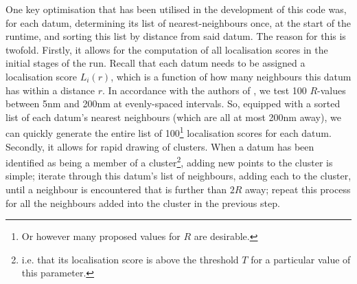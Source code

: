 \documentclass[11pt]{article}
\begin{document}
One key optimisation that has been utilised in the development of this code was, for each datum, determining its list of nearest-neighbours once, at the start of the runtime, and sorting this list by distance from said datum. The reason for this is twofold. Firstly, it allows for the computation of all localisation scores in the initial stages of the run. Recall that each datum needs to be assigned a localisation score $L_i(r)$, which is a function of how many neighbours this datum has within a distance $r$. In accordance with the authors of \cite{Rubin-Delanchy2015}, we test 100 $R$-values between 5nm and 200nm at evenly-spaced intervals. So, equipped with a sorted list of each datum's nearest neighbours (which are all at most 200nm away), we can quickly generate the entire list of 100\footnote{Or however many proposed values for $R$ are desirable.} localisation scores for each datum. \\

Secondly, it allows for rapid drawing of clusters. When a datum has been identified as being a member of a cluster\footnote{i.e. that its localisation score is above the threshold $T$ for a particular value of this parameter.}, adding new points to the cluster is simple; iterate through this datum's list of neighbours, adding each to the cluster, until a neighbour is encountered that is further than $2R$ away; repeat this process for all the neighbours added into the cluster in the previous step.\\
\end{document}
